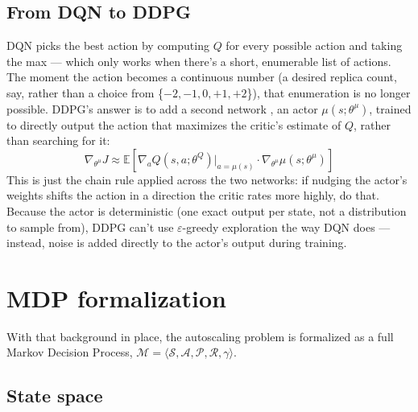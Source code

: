 \documentclass{rapportINPTCLOUD}
\begin{document}
\subsection{From DQN to DDPG}

DQN picks the best action by computing $Q$ for every possible action and taking the max — which only works when there's a short, enumerable list of actions. The moment the action becomes a continuous number (a desired replica count, say, rather than a choice from \{$-2,-1,0,+1,+2$\}), that enumeration is no longer possible. DDPG's answer is to add a second network \cite{lillicrap2016}, an actor $\mu(s;\theta^\mu)$, trained to directly output the action that maximizes the critic's estimate of $Q$, rather than searching for it:
\begin{equation}
\nabla_{\theta^\mu} J \approx \mathbb{E}\left[\nabla_a Q(s,a;\theta^Q)\big|_{a=\mu(s)} \cdot \nabla_{\theta^\mu}\mu(s;\theta^\mu)\right]
\end{equation}
This is just the chain rule applied across the two networks: if nudging the actor's weights shifts the action in a direction the critic rates more highly, do that. Because the actor is deterministic (one exact output per state, not a distribution to sample from), DDPG can't use $\varepsilon$-greedy exploration the way DQN does — instead, noise is added directly to the actor's output during training.

\section{MDP formalization}
\label{sec:mdp}

With that background in place, the autoscaling problem is formalized as a full Markov Decision Process, $\mathcal{M} = \langle \mathcal{S}, \mathcal{A}, \mathcal{P}, \mathcal{R}, \gamma \rangle$.

\subsection{State space}
\end{document}
